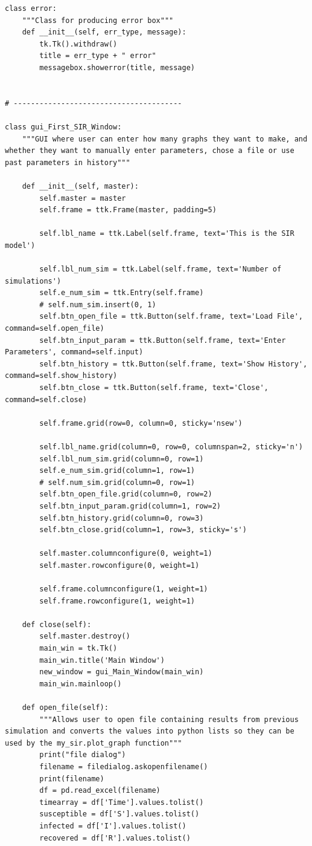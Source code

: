 \documentclass[11pt, a4paper]{article}
\begin{document}
\begin{lstlisting}
class error:
    """Class for producing error box"""
    def __init__(self, err_type, message):
        tk.Tk().withdraw()
        title = err_type + " error"
        messagebox.showerror(title, message)


# ---------------------------------------

class gui_First_SIR_Window:
    """GUI where user can enter how many graphs they want to make, and whether they want to manually enter parameters, chose a file or use past parameters in history"""

    def __init__(self, master):
        self.master = master
        self.frame = ttk.Frame(master, padding=5)

        self.lbl_name = ttk.Label(self.frame, text='This is the SIR model')

        self.lbl_num_sim = ttk.Label(self.frame, text='Number of simulations')
        self.e_num_sim = ttk.Entry(self.frame)
        # self.num_sim.insert(0, 1)
        self.btn_open_file = ttk.Button(self.frame, text='Load File', command=self.open_file)
        self.btn_input_param = ttk.Button(self.frame, text='Enter Parameters', command=self.input)
        self.btn_history = ttk.Button(self.frame, text='Show History', command=self.show_history)
        self.btn_close = ttk.Button(self.frame, text='Close', command=self.close)

        self.frame.grid(row=0, column=0, sticky='nsew')

        self.lbl_name.grid(column=0, row=0, columnspan=2, sticky='n')
        self.lbl_num_sim.grid(column=0, row=1)
        self.e_num_sim.grid(column=1, row=1)
        # self.num_sim.grid(column=0, row=1)
        self.btn_open_file.grid(column=0, row=2)
        self.btn_input_param.grid(column=1, row=2)
        self.btn_history.grid(column=0, row=3)
        self.btn_close.grid(column=1, row=3, sticky='s')

        self.master.columnconfigure(0, weight=1)
        self.master.rowconfigure(0, weight=1)

        self.frame.columnconfigure(1, weight=1)
        self.frame.rowconfigure(1, weight=1)

    def close(self):
        self.master.destroy()
        main_win = tk.Tk()
        main_win.title('Main Window')
        new_window = gui_Main_Window(main_win)
        main_win.mainloop()

    def open_file(self):
        """Allows user to open file containing results from previous simulation and converts the values into python lists so they can be used by the my_sir.plot_graph function"""
        print("file dialog")
        filename = filedialog.askopenfilename()
        print(filename)
        df = pd.read_excel(filename)
        timearray = df['Time'].values.tolist()
        susceptible = df['S'].values.tolist()
        infected = df['I'].values.tolist()
        recovered = df['R'].values.tolist()


\end{lstlisting}
\end{document}
